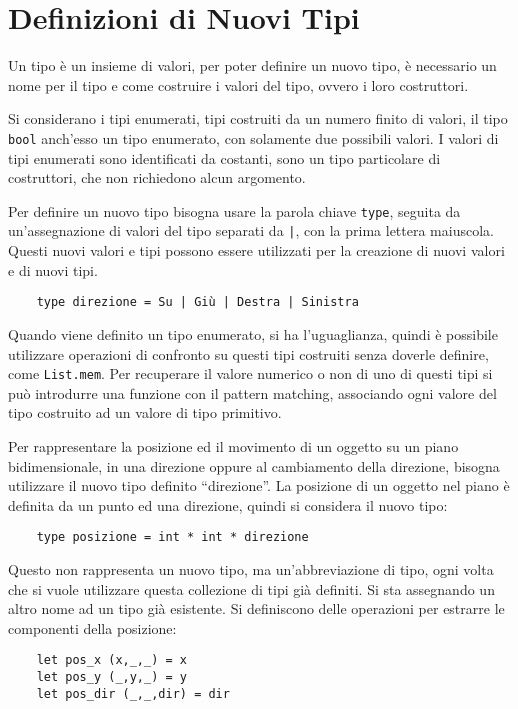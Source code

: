 \documentclass{article}
\numberwithin{equation}{subsection}
\begin{document}
\clearpage

\section{Definizioni di Nuovi Tipi}

Un tipo è un insieme di valori, per poter definire un nuovo tipo, è necessario un nome per il tipo e come costruire i valori del tipo, ovvero i loro costruttori. 


Si considerano i tipi enumerati, tipi costruiti da un numero finito di valori, il tipo \verb|bool| anch'esso un tipo enumerato, con solamente due possibili valori. I valori di tipi enumerati sono identificati da costanti, sono un tipo particolare di costruttori, che non richiedono alcun argomento. 

Per definire un nuovo tipo bisogna usare la parola chiave \verb|type|, seguita da un'assegnazione di valori del tipo separati da \texttt{|}, con la prima lettera maiuscola. Questi nuovi valori e tipi possono essere utilizzati per la creazione di nuovi valori e di nuovi tipi. 

\begin{verbatim}
    type direzione = Su | Giù | Destra | Sinistra
\end{verbatim}


Quando viene definito un tipo enumerato, si ha l'uguaglianza, quindi è possibile utilizzare operazioni di confronto su questi tipi costruiti senza doverle definire, come \verb|List.mem|. Per recuperare il valore numerico o non di uno di questi tipi si può introdurre una funzione con il pattern matching, associando ogni valore del tipo costruito ad un valore di tipo primitivo. 


Per rappresentare la posizione ed il movimento di un oggetto su un piano bidimensionale, in una direzione oppure al cambiamento della direzione, bisogna utilizzare il nuovo tipo definito ``direzione''. La posizione di un oggetto nel piano è definita da un punto ed una direzione, quindi si considera il nuovo tipo:
\begin{verbatim}
    type posizione = int * int * direzione
\end{verbatim}
Questo non rappresenta un nuovo tipo, ma un'abbreviazione di tipo, ogni volta che si vuole utilizzare questa collezione di tipi già definiti. Si sta assegnando un altro nome ad un tipo già esistente. Si definiscono delle operazioni per estrarre le componenti della posizione:
\begin{verbatim}
    let pos_x (x,_,_) = x
    let pos_y (_,y,_) = y
    let pos_dir (_,_,dir) = dir    
\end{verbatim}
\end{document}
